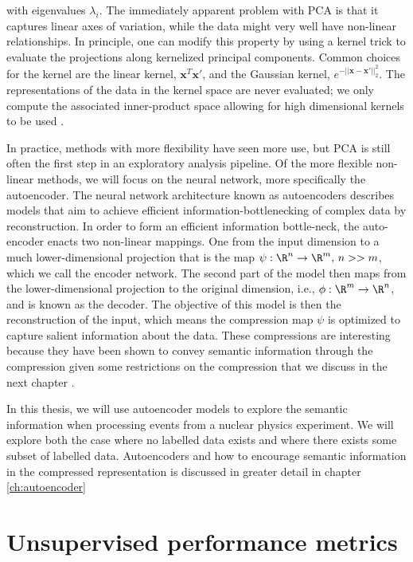 \noindent with eigenvalues $\lambda_i$. The immediately apparent problem with PCA is that it captures linear axes of variation, while the data might very well have non-linear relationships. In principle, one can modify this property by using a kernel trick to evaluate the projections along kernelized principal components. Common choices for the kernel are the linear kernel, $\mathbf{x}^T\mathbf{x}'$, and the Gaussian kernel, $e^{-||\mathbf{x} - \mathbf{x}'||^2_2}$. The representations of the data in the kernel space are never evaluated; we only compute the associated inner-product space allowing for high dimensional kernels to be used \cite{Scholkopf1996}. 

In practice, methods with more flexibility have seen more use, but PCA is still often the first step in an exploratory analysis pipeline. Of the more flexible non-linear methods, we will focus on the neural network, more specifically the autoencoder. The neural network architecture known as autoencoders describes models that aim to achieve efficient information-bottlenecking of complex data by reconstruction. In order to form an efficient information bottle-neck, the auto-encoder enacts two non-linear mappings. One from the input dimension to a much lower-dimensional projection that is the map $\psi: \R^n \rightarrow \R^m,\, n >> m$, which we call the encoder network. The second part of the model then maps from the lower-dimensional projection to the original dimension, i.e., $\phi: \R^m \rightarrow \R^n$, and is known as the decoder. The objective of this model is then the reconstruction of the input, which means the compression map $\psi$ is optimized to capture salient information about the data. These compressions are interesting because they have been shown to convey semantic information through the compression given some restrictions on the compression that we discuss in the next chapter \cite{Fertig}.

In this thesis, we will use autoencoder models to explore the semantic information when processing events from a nuclear physics experiment. We will explore both the case where no labelled data exists and where there exists some subset of labelled data. Autoencoders and how to encourage semantic information in the compressed representation is discussed in greater detail in chapter \ref{ch:autoencoder}

\section{Unsupervised performance metrics}\label{sec:unsupervised_perf}

